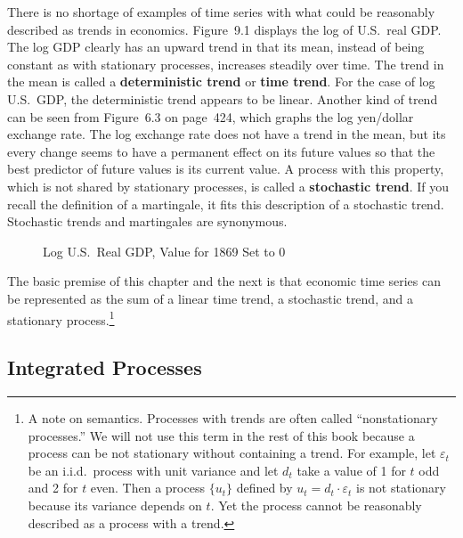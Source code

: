 
There is no shortage of examples of time series with what could be reasonably
described as trends in economics. Figure~9.1 displays the log of U.S.\ real GDP.
The log GDP clearly has an upward trend in that its mean, instead of being constant
as with stationary processes, increases steadily over time. The trend in the mean
is called a \textbf{deterministic trend} or \textbf{time trend}. For the case of log U.S.\ GDP, the
deterministic trend appears to be linear. Another kind of trend can be seen from
Figure~6.3 on page~424, which graphs the log yen/dollar exchange rate. The log
exchange rate does not have a trend in the mean, but its every change seems to have
a permanent effect on its future values so that the best predictor of future values is
its current value. A process with this property, which is not shared by stationary
processes, is called a \textbf{stochastic trend}. If you recall the definition of a martingale,
it fits this description of a stochastic trend. Stochastic trends and martingales are
synonymous.

\begin{figure}[htbp]
\centering
{}
\caption{Log U.S.\ Real GDP, Value for 1869 Set to 0}
\label{fig:9.1}
\end{figure}

The basic premise of this chapter and the next is that economic time series can
be represented as the sum of a linear time trend, a stochastic trend, and a stationary
process.\footnote{A note on semantics. Processes with trends are often called
``nonstationary processes.'' We will not use this term in the rest of this book
because a process can be not stationary without containing a trend. For example,
let $\varepsilon_t$ be an i.i.d.\ process with unit variance and let $d_t$ take a value of 1
for $t$ odd and 2 for $t$ even. Then a process $\{u_t\}$ defined by
$u_t = d_t \cdot \varepsilon_t$ is not stationary because its variance depends on $t$.
Yet the process cannot be reasonably described as a process with a trend.}

\subsection*{Integrated Processes}


